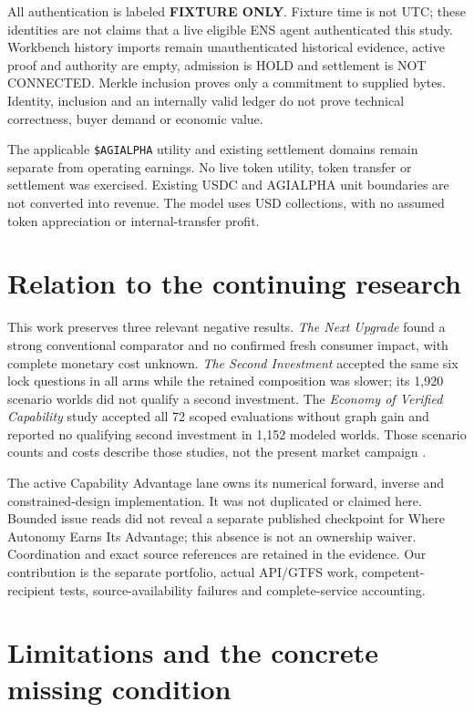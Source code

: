 \documentclass[11pt,letterpaper]{article}
\newcommand{\code}[1]{\texttt{\small #1}}
\begin{document}
All authentication is labeled \textbf{FIXTURE ONLY}. Fixture time is not UTC; these identities
are not claims that a live eligible ENS agent authenticated this study. Workbench history imports
remain unauthenticated historical evidence, active proof and authority are empty, admission is
HOLD and settlement is NOT CONNECTED. Merkle inclusion proves only a commitment to supplied
bytes. Identity, inclusion and an internally valid ledger do not prove technical correctness,
buyer demand or economic value.

The applicable \code{\$AGIALPHA} utility and existing settlement domains remain separate from
operating earnings. No live token utility, token transfer or settlement was exercised. Existing
USDC and AGIALPHA unit boundaries are not converted into revenue. The model uses USD collections,
with no assumed token appreciation or internal-transfer profit.

\section{Relation to the continuing research}

This work preserves three relevant negative results. \emph{The Next Upgrade} found a strong
conventional comparator and no confirmed fresh consumer impact, with complete monetary cost
unknown. \emph{The Second Investment} accepted the same six lock questions in all arms while
the retained composition was slower; its 1,920 scenario worlds did not qualify a second
investment. The \emph{Economy of Verified Capability} study accepted all 72 scoped evaluations
without graph gain and reported no qualifying second investment in 1,152 modeled worlds.
Those scenario counts and costs describe those studies, not the present market campaign \cite{prior}.

The active Capability Advantage lane owns its numerical forward, inverse and constrained-design
implementation. It was not duplicated or claimed here. Bounded issue reads did not reveal a
separate published checkpoint for Where Autonomy Earns Its Advantage; this absence is not an
ownership waiver. Coordination and exact source references are retained in the evidence.
Our contribution is the separate portfolio, actual API/GTFS work, competent-recipient tests,
source-availability failures and complete-service accounting.

\section{Limitations and the concrete missing condition}
\end{document}
